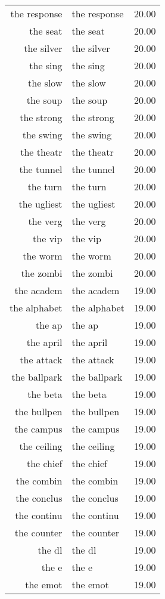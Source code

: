 \begin{table}[ht]
\begin{tabular}{rlr}
  the response & the response & 20.00 \\ 
  the seat & the seat & 20.00 \\ 
  the silver & the silver & 20.00 \\ 
  the sing & the sing & 20.00 \\ 
  the slow & the slow & 20.00 \\ 
  the soup & the soup & 20.00 \\ 
  the strong & the strong & 20.00 \\ 
  the swing & the swing & 20.00 \\ 
  the theatr & the theatr & 20.00 \\ 
  the tunnel & the tunnel & 20.00 \\ 
  the turn & the turn & 20.00 \\ 
  the ugliest & the ugliest & 20.00 \\ 
  the verg & the verg & 20.00 \\ 
  the vip & the vip & 20.00 \\ 
  the worm & the worm & 20.00 \\ 
  the zombi & the zombi & 20.00 \\ 
  the academ & the academ & 19.00 \\ 
  the alphabet & the alphabet & 19.00 \\ 
  the ap & the ap & 19.00 \\ 
  the april & the april & 19.00 \\ 
  the attack & the attack & 19.00 \\ 
  the ballpark & the ballpark & 19.00 \\ 
  the beta & the beta & 19.00 \\ 
  the bullpen & the bullpen & 19.00 \\ 
  the campus & the campus & 19.00 \\ 
  the ceiling & the ceiling & 19.00 \\ 
  the chief & the chief & 19.00 \\ 
  the combin & the combin & 19.00 \\ 
  the conclus & the conclus & 19.00 \\ 
  the continu & the continu & 19.00 \\ 
  the counter & the counter & 19.00 \\ 
  the dl & the dl & 19.00 \\ 
  the e & the e & 19.00 \\ 
  the emot & the emot & 19.00 \\ 

\end{tabular}
\end{table}
